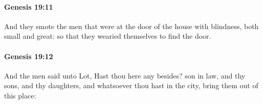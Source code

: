 		\paragraph{Genesis 19:11} %
			\label{GENESIS-19-11}

			And they smote the men that were at the door of the house with blindness, both small and great: so that they wearied themselves to find the door.


		\paragraph{Genesis 19:12} %
			\label{GENESIS-19-12}

			And the men said unto Lot, Hast thou here any besides? son in law, and thy sons, and thy daughters, and whatsoever thou hast in the city, bring them out of this place:


